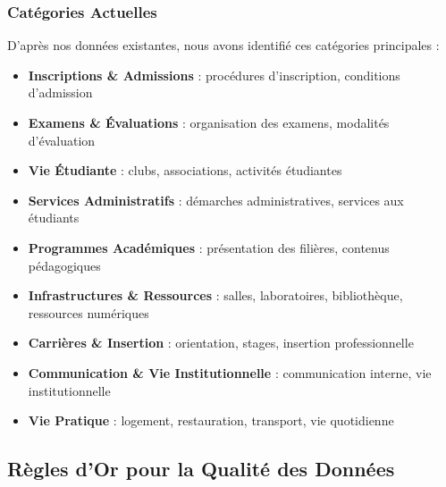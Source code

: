 \documentclass[11pt,a4paper]{article}
\begin{document}
\subsubsection{Catégories Actuelles}

D'après nos données existantes, nous avons identifié ces catégories principales :

\begin{itemize} \item \textbf{Inscriptions \& Admissions} : procédures d'inscription, conditions d'admission \item \textbf{Examens \& Évaluations} : organisation des examens, modalités d'évaluation \item \textbf{Vie Étudiante} : clubs, associations, activités étudiantes \item \textbf{Services Administratifs} : démarches administratives, services aux étudiants \item \textbf{Programmes Académiques} : présentation des filières, contenus pédagogiques \item \textbf{Infrastructures \& Ressources} : salles, laboratoires, bibliothèque, ressources numériques \item \textbf{Carrières \& Insertion} : orientation, stages, insertion professionnelle \item \textbf{Communication \& Vie Institutionnelle} : communication interne, vie institutionnelle \item \textbf{Vie Pratique} : logement, restauration, transport, vie quotidienne \end{itemize}

\clearpage

\subsection{Règles d'Or pour la Qualité des Données}
\end{document}
